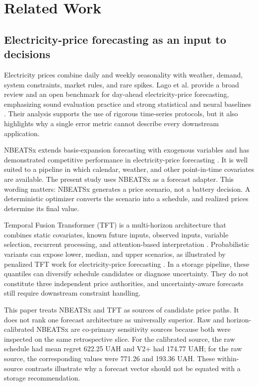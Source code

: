 \section{Related Work}

\subsection{Electricity-price forecasting as an input to decisions}

Electricity prices combine daily and weekly seasonality with weather, demand, system constraints, market rules, and rare spikes. Lago et al. provide a broad review and an open benchmark for day-ahead electricity-price forecasting, emphasizing sound evaluation practice and strong statistical and neural baselines \cite{lago2021epf}. Their analysis supports the use of rigorous time-series protocols, but it also highlights why a single error metric cannot describe every downstream application.

NBEATSx extends basis-expansion forecasting with exogenous variables and has demonstrated competitive performance in electricity-price forecasting \cite{olivares2023nbeatsx}. It is well suited to a pipeline in which calendar, weather, and other point-in-time covariates are available. The present study uses NBEATSx as a forecast adapter. This wording matters: NBEATSx generates a price scenario, not a battery decision. A deterministic optimizer converts the scenario into a schedule, and realized prices determine its final value.

Temporal Fusion Transformer (TFT) is a multi-horizon architecture that combines static covariates, known future inputs, observed inputs, variable selection, recurrent processing, and attention-based interpretation \cite{lim2021tft}. Probabilistic variants can expose lower, median, and upper scenarios, as illustrated by penalized TFT work for electricity-price forecasting \cite{jiang2024ptft}. In a storage pipeline, these quantiles can diversify schedule candidates or diagnose uncertainty. They do not constitute three independent price authorities, and uncertainty-aware forecasts still require downstream constraint handling.

This paper treats NBEATSx and TFT as sources of candidate price paths. It does not rank one forecast architecture as universally superior. Raw and horizon-calibrated NBEATSx are co-primary sensitivity sources because both were inspected on the same retrospective slice. For the calibrated source, the raw schedule had mean regret 622.25 UAH and V2+ had 174.77 UAH; for the raw source, the corresponding values were 771.26 and 193.36 UAH. These within-source contrasts illustrate why a forecast vector should not be equated with a storage recommendation.

